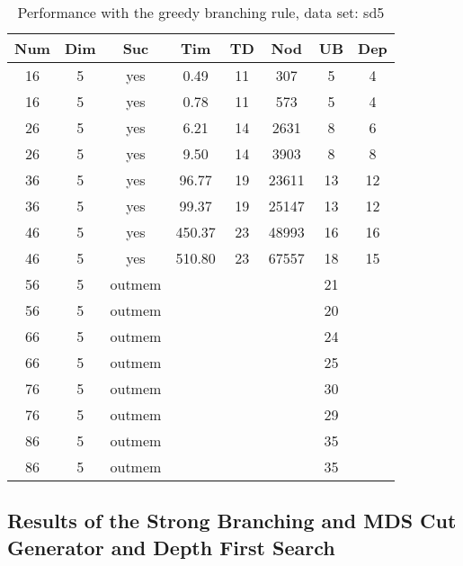 \begin{table}[!htb]
  \centering
  \begin{tabular}[center]{|c|c|c|c|c|c|c|c|}
    \hline
    Num & Dim & Suc & Tim & TD & Nod & UB & Dep \\
    \hline
    16 & 5 & yes & 0.49 & 11 & 307 & 5 & 4 \\
    16 & 5 & yes & 0.78 & 11 & 573 & 5 & 4 \\
    26 & 5 & yes & 6.21 & 14 & 2631 & 8 & 6 \\
    26 & 5 & yes & 9.50 & 14 & 3903 & 8 & 8 \\
    36 & 5 & yes & 96.77 & 19 & 23611 & 13 & 12 \\
    36 & 5 & yes & 99.37 & 19 & 25147 & 13 & 12 \\
    46 & 5 & yes & 450.37 & 23 & 48993 & 16 & 16 \\
    46 & 5 & yes & 510.80 & 23 & 67557 & 18 & 15 \\
    56 & 5 & outmem &  &  &  & 21 &  \\
    56 & 5 & outmem &&&& 20 &\\
    66 & 5 & outmem &&&& 24 &\\
    66 & 5 & outmem &  &  &  & 25 &  \\
    76 & 5 & outmem &&&& 30 &\\
    76 & 5 & outmem &&&& 29 &\\
    86 & 5 & outmem &&&& 35 &\\
    86 & 5 & outmem &&&& 35 &\\
    \hline
  \end{tabular}
  \caption{Performance with the greedy branching rule, data set: sd5}
  \label{tab:test.cutmds-sd5}
\end{table}

\clearpage
\subsection{Results of the Strong Branching and MDS Cut Generator and Depth First Search}
\label{sec:apd.bac.bran}

